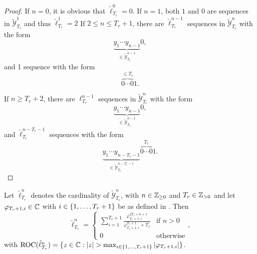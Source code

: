 \documentclass{article}
\begin{document}
    \begin{proof}
      If $n = 0$, it is obvious that $\tilde{\ell}_{T_r}^{0} = 0$. If $n = 1$, both $1$ and $0$ are sequences in $\tilde{\mathcal{Y}}_{T_r}^{1}$ and thus $\tilde{\ell}_{T_r}^{1} = 2$
      If $2 \leq n \leq T_r + 1$, there are $\tilde{\ell}_{T_r}^{n-1}$ sequences in $\tilde{\mathcal{Y}}_{T_r}^{n}$ with the form
      \begin{equation*}
        \underbrace{y_{1} \cdots y_{n-1}}_{\in \tilde{\mathcal{Y}}_{T_r}^{n-1}} 0,
      \end{equation*} 
      and 1 sequence with the form
      \begin{equation*}
        \overbrace{0 \cdots 0}^{\leq T_r} 1.
      \end{equation*}
      
      If $n \geq T_r + 2$, there are $\ell_{T_r}^{n-1}$ sequences in $\tilde{\mathcal{Y}}_{T_r}^{n}$ with the form
      \begin{equation*}
        \underbrace{y_{1} \cdots y_{n-1}}_{\in \tilde{\mathcal{Y}}_{T_r}^{n-1}} 0,
      \end{equation*} 
      and $\tilde{\ell}_{T_r}^{n-T_r-1}$ sequences with the form
      \begin{equation*}
        \underbrace{y_{1} \cdots y_{n-T_r-1}}_{\in \tilde{\mathcal{Y}}_{T_r}^{n-T_r-1}} \overbrace{0 \cdots 0}^{T_r} 1.
      \end{equation*} 
    \end{proof}

    \begin{theorem} \label{thm:1-main}
      Let $\tilde{\ell}_{T_r}^n$ denotes the cardinality of $\tilde{\mathcal{Y}}_{T_r}^n$, with $n \in \mathbb{Z}_{\geq 0}$ and $T_r \in \mathbb{Z}_{> 0}$ and let $\varphi_{T_r + 1, i} \in \mathbb C$ 
      with $i \in \{1, \dots, T_r + 1\}$ be as defined in . Then 
      \begin{equation}
        \tilde{\ell}_{T_r}^{n} = 
        \left\{
          \begin{array}{ll}
            \sum_{i = 1}^{T_r + 1} \frac{\varphi_{T_r + 1, i}^{2T_r + n + 1}}
            {\varphi_{T_r + 1, i}^{T_r + 1} + T_r} & \mbox{if } n > 0 \\
            0 & \mbox{otherwise}
          \end{array}
        \right.,
      \end{equation}
      with $\textnormal{ROC}(\tilde{\ell}_{T_r}^{n}) = \{z \in \mathbb C : |z| > \max_{i \in \{1, \dots, T_r + 1\}} |\varphi_{T_r + 1, i}|\}$.
    \end{theorem}
\end{document}
